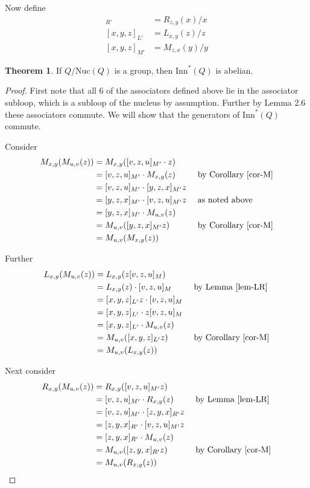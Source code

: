\documentclass[12pt, twoside, openright]{report}
\theoremstyle{definition}
\newtheorem{thm}{Theorem}[chapter]
\newcommand{\rdv}{/}                %
\newcommand{\nuc}{\text{Nuc}}       %
\newcommand{\inn}{\text{Inn}}       %
\begin{document}
Now define
  \begin{align*}
    [x, y, z]_{R'} &= R_{z, y}(x)\rdv x\\
    [x, y, z]_{L'} &= L_{x, y}(z)\rdv z\\
    [x, y, z]_{M'} &= M_{z, x}(y)\rdv y
  \end{align*}

\begin{thm}\label{inn*}
  If $Q/\nuc(Q)$ is a group, then $\inn^*(Q)$ is abelian.
\end{thm}

\begin{proof}
  First note that all 6 of the associators defined above lie in the associator subloop, which
    is a subloop of the nucleus by assumption. Further by \cite{PACC} Lemma 2.6 these associators
    commute. We will show that the generators of $\inn^*(Q)$ commute.

  Consider
  \begin{alignat*}{2}
    M_{x, y}(M_{u, v}(z)) &= M_{x, y}([v, z, u]_{M'}\cdot z) &&\\
    &= [v, z, u]_{M'}\cdot M_{x, y}(z) &&\text{ by Corollary \ref{cor-M}}\\
    &= [v, z, u]_{M'}\cdot [y, z, x]_{M'}z &&\\
    &= [y, z, x]_{M'}\cdot [v, z, u]_{M'}z &&\text{ as noted above}\\
    &= [y, z, x]_{M'}\cdot M_{u, v}(z) &&\\
    &= M_{u, v}([y, z, x]_{M'}z) &&\text{ by Corollary \ref{cor-M}}\\
    &= M_{u, v}(M_{x, y}(z))
  \end{alignat*}

  Further
  \begin{alignat*}{2}
    L_{x, y}(M_{u, v}(z)) &= L_{x, y}(z[v, z, u]_M) &&\\
    &= L_{x, y}(z)\cdot [v, z, u]_M &&\text{ by Lemma \ref{lem-LR}}\\
    &= [x, y, z]_{L'}z \cdot [v, z, u]_M &&\\
    &= [x, y, z]_{L'} \cdot z[v, z, u]_M &&\\
    &= [x, y, z]_{L'} \cdot M_{u, v}(z) &&\\
    &= M_{u, v}([x, y, z]_{L'} z) &&\text{ by Corollary \ref{cor-M}}\\
    &= M_{u, v}(L_{x, y}(z)) &&
  \end{alignat*}

  Next consider
  \begin{alignat*}{2}
    R_{x, y}(M_{u, v}(z)) &= R_{x, y}([v, z, u]_{M'}z) &&\\
    &= [v, z, u]_{M'}\cdot R_{x, y}(z) &&\text{ by Lemma \ref{lem-LR}}\\
    &= [v, z, u]_{M'}\cdot [z, y, x]_{R'}z &&\\
    &= [z, y, x]_{R'}\cdot [v, z, u]_{M'}z &&\\
    &= [z, y, x]_{R'}\cdot M_{u, v}(z) &&\\
    &= M_{u, v}([z, y, x]_{R'}z) &&\text{ by Corollary \ref{cor-M}}\\
    &= M_{u, v}(R_{x, y}(z)) &&
  \end{alignat*}


\end{proof}
\end{document}
